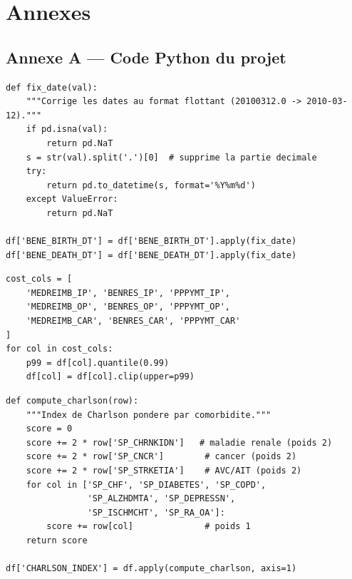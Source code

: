 \chapter*{Annexes}

\section*{Annexe A --- Code Python du projet}
\label{ann:code}

\begin{lstlisting}[caption={Correction des dates flottantes (data cleaning)},
                   label={lst:date_fix}]
def fix_date(val):
    """Corrige les dates au format flottant (20100312.0 -> 2010-03-12)."""
    if pd.isna(val):
        return pd.NaT
    s = str(val).split('.')[0]  # supprime la partie decimale
    try:
        return pd.to_datetime(s, format='%Y%m%d')
    except ValueError:
        return pd.NaT

df['BENE_BIRTH_DT'] = df['BENE_BIRTH_DT'].apply(fix_date)
df['BENE_DEATH_DT'] = df['BENE_DEATH_DT'].apply(fix_date)
\end{lstlisting}

\begin{lstlisting}[caption={Winsorisation des colonnes de coûts},
                   label={lst:winsor}]
cost_cols = [
    'MEDREIMB_IP', 'BENRES_IP', 'PPPYMT_IP',
    'MEDREIMB_OP', 'BENRES_OP', 'PPPYMT_OP',
    'MEDREIMB_CAR', 'BENRES_CAR', 'PPPYMT_CAR'
]
for col in cost_cols:
    p99 = df[col].quantile(0.99)
    df[col] = df[col].clip(upper=p99)
\end{lstlisting}

\begin{lstlisting}[caption={Calcul de l'index de Charlson},
                   label={lst:charlson}]
def compute_charlson(row):
    """Index de Charlson pondere par comorbidite."""
    score = 0
    score += 2 * row['SP_CHRNKIDN']   # maladie renale (poids 2)
    score += 2 * row['SP_CNCR']        # cancer (poids 2)
    score += 2 * row['SP_STRKETIA']    # AVC/AIT (poids 2)
    for col in ['SP_CHF', 'SP_DIABETES', 'SP_COPD',
                'SP_ALZHDMTA', 'SP_DEPRESSN',
                'SP_ISCHMCHT', 'SP_RA_OA']:
        score += row[col]              # poids 1
    return score

df['CHARLSON_INDEX'] = df.apply(compute_charlson, axis=1)
\end{lstlisting}

